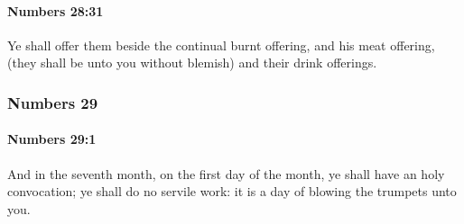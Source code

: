 		\paragraph{Numbers 28:31} %
			\label{NUMBERS-28-31}

			Ye shall offer them beside the continual burnt offering, and his meat offering, (they shall be unto you without blemish) and their drink offerings.

	\subsubsection{Numbers 29} %
		\label{NUMBERS-29}

		\paragraph{Numbers 29:1} %
			\label{NUMBERS-29-1}

			And in the seventh month, on the first day of the month, ye shall have an holy convocation; ye shall do no servile work: it is a day of blowing the trumpets unto you.

